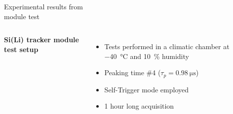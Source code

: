 \documentclass[aspectratio=169,xcolor=dvipsnames]{beamer}
\begin{document}
\begin{frame}{\vspace{-0.3cm}Experimental results from\\ \vskip-0.15cm module test}
    \addtolength{\leftmargini}{\labelsep}

    \begin{columns}

            \fontsize{10pt}{1}\selectfont
            \vskip0.1cm
            \textbf{Si(Li) tracker module test setup} \\
            \vspace{0.05cm}
            
            \fontsize{8.5pt}{1}\selectfont
            \begin{itemize}
                \item Tests performed in a climatic chamber at \SI{-40}{\celsius} and \SI{10}{\percent} humidity
                \item Peaking time \#4 ($\tau_{p} = \SI{0.98}{\micro\second}$)
                \item Self-Trigger mode employed
                \item 1 hour long acquisition
            \end{itemize}
            

\end{columns}
\end{frame}
\end{document}
